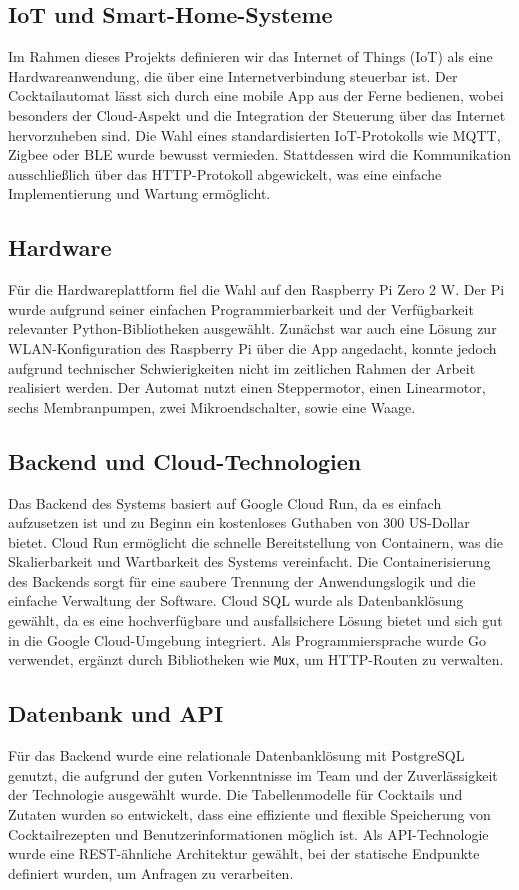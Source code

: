 \subsection{IoT und Smart-Home-Systeme}
Im Rahmen dieses Projekts definieren wir das Internet of Things (IoT) als eine Hardwareanwendung, 
die über eine Internetverbindung steuerbar ist. Der Cocktailautomat lässt sich durch eine mobile 
App aus der Ferne bedienen, wobei besonders der Cloud-Aspekt und die Integration der Steuerung über 
das Internet hervorzuheben sind. Die Wahl eines standardisierten IoT-Protokolls wie MQTT, Zigbee 
oder BLE wurde bewusst vermieden. Stattdessen wird die Kommunikation ausschließlich über das 
HTTP-Protokoll abgewickelt, was eine einfache Implementierung und Wartung ermöglicht.

\subsection{Hardware}
Für die Hardwareplattform fiel die Wahl auf den Raspberry Pi Zero 2 W. Der Pi wurde aufgrund seiner 
einfachen Programmierbarkeit und der Verfügbarkeit relevanter Python-Bibliotheken ausgewählt. 
Zunächst war auch eine Lösung zur WLAN-Konfiguration des Raspberry Pi über die App angedacht, konnte 
jedoch aufgrund technischer Schwierigkeiten nicht im zeitlichen Rahmen der Arbeit realisiert werden. 
Der Automat nutzt einen Steppermotor, einen Linearmotor, sechs Membranpumpen, zwei Mikroendschalter, 
sowie eine Waage.

\subsection{Backend und Cloud-Technologien}
Das Backend des Systems basiert auf Google Cloud Run, da es einfach aufzusetzen ist und zu Beginn 
ein kostenloses Guthaben von 300 US-Dollar bietet. Cloud Run ermöglicht die schnelle Bereitstellung 
von Containern, was die Skalierbarkeit und Wartbarkeit des Systems vereinfacht. Die 
Containerisierung des Backends sorgt für eine saubere Trennung der Anwendungslogik und die einfache 
Verwaltung der Software. Cloud SQL wurde als Datenbanklösung gewählt, da es eine hochverfügbare und 
ausfallsichere Lösung bietet und sich gut in die Google Cloud-Umgebung integriert. Als 
Programmiersprache wurde Go verwendet, ergänzt durch Bibliotheken wie \texttt{Mux}, um HTTP-Routen 
zu verwalten.

\subsection{Datenbank und API}
Für das Backend wurde eine relationale Datenbanklösung mit PostgreSQL genutzt, die aufgrund der 
guten Vorkenntnisse im Team und der Zuverlässigkeit der Technologie ausgewählt wurde. Die 
Tabellenmodelle für Cocktails und Zutaten wurden so entwickelt, dass eine effiziente und flexible 
Speicherung von Cocktailrezepten und Benutzerinformationen möglich ist. Als API-Technologie wurde 
eine REST-ähnliche Architektur gewählt, bei der statische Endpunkte definiert wurden, um Anfragen 
zu verarbeiten.

